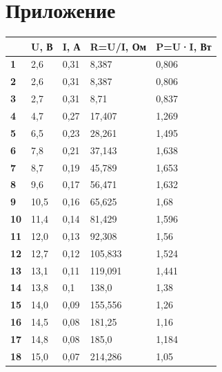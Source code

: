 \documentclass[14pt, a4paper, twoside]{extreport}
\begin{document}
\appendix
\titleformat{\chapter}[block]{\huge\bfseries\centering}{}{0pt}{}

\chapter{Приложение \thechapter}
\label{chp:highoms}

\begin{table}[H]
  \centering
  \footnotesize
  \begin{tabular}{|l|l|l|l|l|}
    \hline
    & \textbf{U, В} & \textbf{I, А} & \textbf{R=U/I, Ом} & \textbf{P=U·I, Вт} \\ \hline
    \textbf{1}  & 2,6  & 0,31 & 8,387     & 0,806     \\ \hline
    \textbf{2}  & 2,6  & 0,31 & 8,387     & 0,806     \\ \hline
    \textbf{3}  & 2,7  & 0,31 & 8,71      & 0,837     \\ \hline
    \textbf{4}  & 4,7  & 0,27 & 17,407    & 1,269     \\ \hline
    \textbf{5}  & 6,5  & 0,23 & 28,261    & 1,495     \\ \hline
    \textbf{6}  & 7,8  & 0,21 & 37,143    & 1,638     \\ \hline
    \textbf{7}  & 8,7  & 0,19 & 45,789    & 1,653     \\ \hline
    \textbf{8}  & 9,6  & 0,17 & 56,471    & 1,632     \\ \hline
    \textbf{9}  & 10,5 & 0,16 & 65,625    & 1,68      \\ \hline
    \textbf{10} & 11,4 & 0,14 & 81,429    & 1,596     \\ \hline
    \textbf{11} & 12,0 & 0,13 & 92,308    & 1,56      \\ \hline
    \textbf{12} & 12,7 & 0,12 & 105,833   & 1,524     \\ \hline
    \textbf{13} & 13,1 & 0,11 & 119,091   & 1,441     \\ \hline
    \textbf{14} & 13,8 & 0,1  & 138,0     & 1,38      \\ \hline
    \textbf{15} & 14,0 & 0,09 & 155,556   & 1,26      \\ \hline
    \textbf{16} & 14,5 & 0,08 & 181,25    & 1,16      \\ \hline
    \textbf{17} & 14,8 & 0,08 & 185,0     & 1,184     \\ \hline
    \textbf{18} & 15,0 & 0,07 & 214,286   & 1,05      \\ \hline

\end{tabular}
\end{table}
\end{document}
